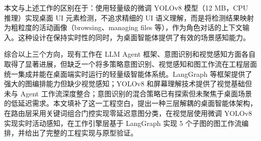 本文与上述工作的区别在于：使用轻量级的微调 YOLOv8 模型（12 MB，CPU 推理）实现桌面 UI 元素检测，不追求精细的 UI 语义理解，而是将检测结果映射为粗粒度的活动画像（browsing、managing files 等），作为角色对话的上下文输入。这种设计在保持实时性的同时，为桌面智能体提供了有效的场景感知能力。

\medskip
综合以上三个方向，现有工作在 LLM Agent 框架、意图识别和视觉感知方面各自取得了显著进展，但缺乏一个将多策略意图识别、视觉感知和图工作流在工程层面统一集成并能在桌面端实时运行的轻量级智能体系统。LangGraph 等框架提供了强大的图编排能力但缺少视觉感知；YOLOv8 和屏幕理解技术提供了视觉基础但未与 Agent 工作流深度整合；意图识别的混合策略已有探索但未聚焦于桌面场景的低延迟需求。本文填补了这一工程空白，提出一种三层解耦的桌面智能体架构，在路由层采用关键词组合门控实现零延迟意图分类，在视觉层使用微调 YOLOv8 实现实时活动感知，在工作引擎层基于 LangGraph 实现 5 个子图的图工作流编排，并给出了完整的工程实现与原型验证。
